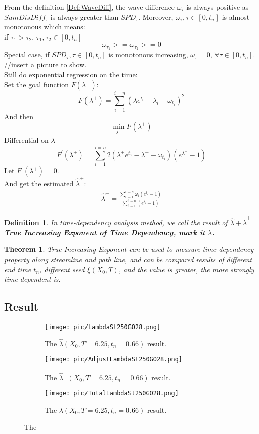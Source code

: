 \documentclass[
     11pt,         %
     a4paper,      %
     oneside,
     ]{article}
\newtheorem{mydef}{Definition}
\newtheorem{mytheory}{Theorem}
\begin{document}
From the definition \ref{Def:WaveDiff}, the wave difference $\omega_{\tau}$ is always positive as $SumDisDiff_{\tau}$ is always greater than $SPD_{\tau}$. Moreover, $\omega_{\tau}, \tau\in[0,t_{n}]$ is almost monotonous which means:\\
if $\tau_{1}>\tau_{2}$, $\tau_{1},\tau_{2}\in[0,t_{n}]$\\
$$\omega_{\tau_{1}}>=\omega_{\tau_{2}}>=0$$
Special case, if $SPD_{\tau}, \tau\in[0,t_{n}]$ is monotonous increasing, $\omega_{\tau}=0$, $\forall \tau\in[0,t_{n}]$.
//insert a picture to show.\\
Still do exponential regression on  the time:\\
Set the goal function $F(\lambda^{+})$:
$$F(\lambda^{+})=\sum_{i=1}^{i=n}(\lambda e^{t_{i}}-\lambda_{i}-\omega_{t_{i}})^{2}$$
And then $$\min_{\lambda^{+}} F(\lambda^{+})$$
Differential on $\lambda^{+}$
$$F^{'}(\lambda^{+})=\sum_{i=1}^{i=n}2(\lambda^{+} e^{t_{i}}-\lambda^{+}-\omega_{t_{i}})(e^{\lambda^{+}}-1)$$
Let $F^{'}(\lambda^{+})=0$.\\
And get the estimated $\hat{\lambda}^{+}$:
\begin{eqnarray}
\label{Equation:lambda+}
\hat{\lambda}^{+}=\frac{\sum_{i=1}^{i=n}\omega_{i}(e^{t_{i}}-1)}{\sum_{i=1}^{i=n}(e^{t_{i}}-1)}
\end{eqnarray}
\begin{mydef}\label{Def:TrueLamda}
	In time-dependency analysis method, we call the result of $\hat{\lambda}+\hat{\lambda}^{+}$ \textbf{True Increasing Exponent of Time Dependency, mark it $\lambda$. } 
\end{mydef}
\begin{mytheory}\label{theo:tureincresingExponent}
	True Increasing Exponent can be used to measure time-dependency property along streamline and path line, and can be compared results of different end time $t_{n}$, different seed $\xi(X_{0},T)$, and the value is greater, the more strongly time-dependent is.
\end{mytheory}
\subsection{Result}

\begin{figure}[H]
	\centering
	\begin{subfigure}{0.3\textwidth}
		\centering
		\texttt{[image: pic/LambdaSt250GO28.png]}
		\caption{The $\hat{\lambda}(X_{0}, T=6.25, t_{n}=0.66)$ result.}
	\end{subfigure}
	\begin{subfigure}{0.3\textwidth}
		\centering
		\texttt{[image: pic/AdjustLambdaSt250GO28.png]}
		\caption{ The $\hat{\lambda}^{+}(X_{0}, T=6.25, t_{n}=0.66)$ result.}
	\end{subfigure}
	\begin{subfigure}{0.3\textwidth}
		\centering
		\texttt{[image: pic/TotalLambdaSt250GO28.png]}
		\caption{ The $\lambda(X_{0}, T=6.25, t_{n}=0.66)$ result.}
	\end{subfigure}
	
	\caption{The}
	\label{fig:lamadaResult0.66s}
\end{figure}
\end{document}
